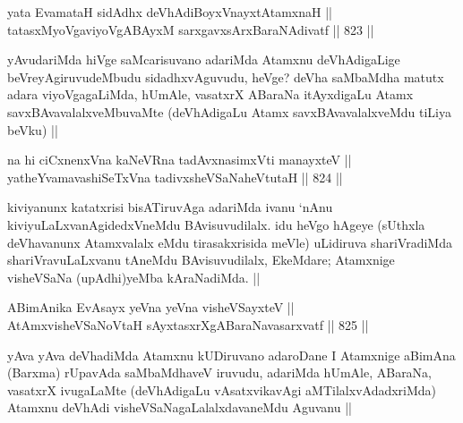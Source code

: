 
\begin{shl}
yata EvamataH sidAdhx deVhAdiBoyxV\s nayxtA\s \s tamxnaH || \\
tatasxMyoVgaviyoVgABAyxM sarxgavxsArxBaraNAdivatf ||  823 ||  
\end{shl}

\begin{artha}
yAvudariMda hiVge saMcarisuvano adariMda Atamxnu deVhAdigaLige beVreyAgiruvudeMbudu sidadhxvAguvudu, heVge? deVha saMbaMdha matutx adara viyoVgagaLiMda, hUmAle, vasatxrX ABaraNa itAyxdigaLu Atamx savxBAvavalalxveMbuvaMte (deVhAdigaLu Atamx savxBAvavalalxveMdu tiLiya beVku) ||
\end{artha}


\begin{shl}
na hi ciCxnenxVna kaNeVRna tadAvxnasimxVti manayxteV || \\
yatheYvamavashiSeTxVna tadivxsheVSaNaheVtutaH ||  824 ||  
\end{shl}

\begin{artha}
kiviyanunx katatxrisi bisATiruvAga adariMda ivanu `nAnu kiviyuLaLxvanAgidedxVneMdu BAvisuvudilalx. idu heVgo hAgeye (sUthxla deVhavanunx Atamxvalalx eMdu tirasakxrisida meVle) uLidiruva shariVradiMda shariVravuLaLxvanu tAneMdu BAvisuvudilalx, EkeMdare; Atamxnige visheVSaNa (upAdhi)yeMba kAraNadiMda. ||
\end{artha}


\begin{shl}
ABimAnika EvAsayx yeVna yeVna visheVSayxteV || \\
AtAmx\s visheVSaNoV\s taH sAyxtasxrXgABaraNavasarxvatf ||  825 ||  
\end{shl}

\begin{artha}
yAva yAva deVhadiMda Atamxnu kUDiruvano adaroDane I Atamxnige aBimAna (Barxma) rUpavAda saMbaMdhaveV iruvudu, adariMda hUmAle, ABaraNa, vasatxrX ivugaLaMte (deVhAdigaLu vAsatxvikavAgi aMTilalxvAdadxriMda) Atamxnu deVhAdi visheVSaNagaLalalxdavaneMdu Aguvanu ||
\end{artha}

